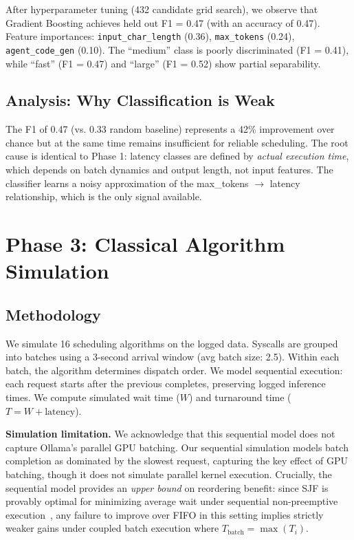 \documentclass[conference]{IEEEtran}
\begin{document}
After hyperparameter tuning (432  candidate grid search), we observe that Gradient Boosting achieves held out F1 = 0.47 (with an accuracy of 0.47). Feature importances: \texttt{input\_char\_length} (0.36), \texttt{max\_tokens} (0.24), \texttt{agent\_code\_gen} (0.10). The ``medium'' class is poorly discriminated (F1 = 0.41), while ``fast'' (F1 = 0.47) and ``large'' (F1 = 0.52) show partial separability.

\subsection{Analysis: Why Classification is Weak}

The F1 of 0.47 (vs. 0.33 random baseline) represents a 42\% improvement over chance but at the same time remains insufficient for reliable scheduling. The root cause is identical to Phase 1: latency classes are defined by \textit{actual execution time}, which depends on batch dynamics and output length, not input features. The classifier learns a noisy approximation of the max\_tokens $\rightarrow$ latency relationship, which is the only signal available.


\section{Phase 3: Classical Algorithm Simulation}

\subsection{Methodology}
We simulate 16 scheduling algorithms on the logged data. Syscalls are grouped into batches using a 3-second arrival window (avg batch size: 2.5). Within each batch, the algorithm determines dispatch order. We model sequential execution: each request starts after the previous completes, preserving logged inference times. We compute simulated wait time ($W$) and turnaround time ($T = W + \text{latency}$).

\textbf{Simulation limitation.} We acknowledge that this sequential model does not capture Ollama's parallel GPU batching. Our sequential simulation models batch completion as dominated by the slowest request, capturing the key effect of GPU batching, though it does not simulate parallel kernel execution. Crucially, the sequential model provides an \textit{upper bound} on reordering benefit: since SJF is provably optimal for minimizing average wait under sequential non-preemptive execution~\cite{silberschatz2018os}, any failure to improve over FIFO in this setting implies strictly weaker gains under coupled batch execution where $T_{\text{batch}} = \max(T_i)$.
\end{document}
